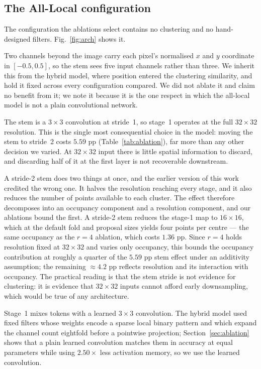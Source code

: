 \subsection{The All-Local configuration}

The configuration the ablations select contains no clustering and no
hand-designed filters. Fig.~\ref{fig:arch} shows it.

Two channels beyond the image carry each pixel's normalised $x$ and $y$
coordinate in $[-0.5, 0.5]$, so the stem sees five input channels rather than
three. We inherit this from the hybrid model, where position entered the
clustering similarity, and hold it fixed across every configuration compared.
We did not ablate it and claim no benefit from it; we note it because it is
the one respect in which the all-local model is not a plain convolutional
network.

The stem is a $3\times3$ convolution at stride~1, so stage~1 operates at the
full $32\times32$ resolution. This is the single most consequential choice in
the model: moving the stem to stride~2 costs $5.59$ pp
(Table~\ref{tab:ablation}), far more than any other decision we varied. At
$32\times32$ input there is little spatial information to discard, and
discarding half of it at the first layer is not recoverable downstream.

A stride-2 stem does two things at once, and the earlier version of this work
credited the wrong one. It halves the resolution reaching every stage, and it
also reduces the number of points available to each cluster. The effect
therefore decomposes into an occupancy component and a resolution component,
and our ablations bound the first. A stride-2 stem reduces the stage-1 map to
$16\times16$, which at the default fold and proposal sizes yields four points
per centre --- the same occupancy as the $r = 4$ ablation, which costs $1.36$
pp. Since $r = 4$ holds resolution fixed at $32\times32$ and varies only
occupancy, this bounds the occupancy contribution at roughly a quarter of the
$5.59$ pp stem effect under an additivity assumption; the remaining
${\approx}4.2$ pp reflects resolution and its interaction with occupancy. The
practical reading is that the stem stride is not evidence for
clustering: it is evidence that $32\times32$ inputs cannot afford early
downsampling, which would be true of any architecture.

Stage~1 mixes tokens with a learned $3\times3$ convolution. The hybrid model
used fixed filters whose weights encode a sparse local binary pattern and
which expand the channel count eightfold before a pointwise projection;
Section~\ref{sec:ablation} shows that a plain learned convolution matches them
in accuracy at equal parameters while using $2.50\times$ less activation
memory, so we use the learned convolution.

